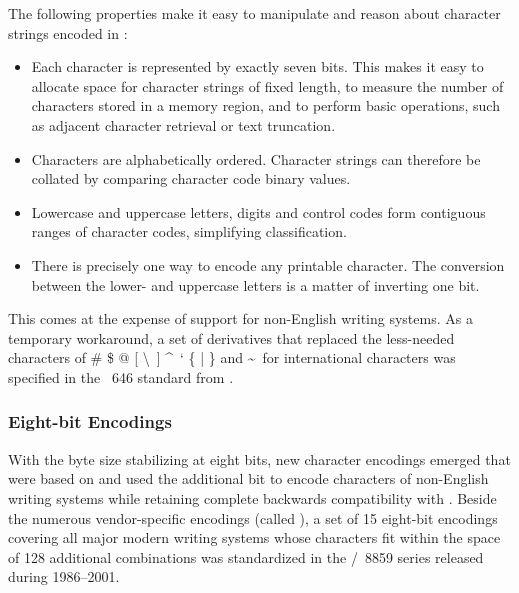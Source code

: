 The following properties make it easy to manipulate and reason about character
strings encoded in :
\begin{itemize}
  \item Each character is represented by exactly seven bits. This makes it easy
    to allocate space for character strings of fixed length, to measure the
    number of characters stored in a memory region, and to perform basic
    operations, such as adjacent character retrieval or text truncation.
  \item Characters are alphabetically ordered. Character strings can therefore
    be collated by comparing character code binary values.
  \item Lowercase and uppercase letters, digits and control codes form
    contiguous ranges of character codes, simplifying classification.
  \item There is precisely one way to encode any printable character. The
    conversion between the lower- and uppercase letters is a matter of
    inverting one bit.
\end{itemize}
This comes at the expense of support for non-English writing systems. As a
temporary workaround, a set of  derivatives that replaced the
less-needed characters of \# \$ @ [ \textbackslash\ ] \textasciicircum\ ` \{ |
\} and \textasciitilde\ for international characters was specified in the
~646 standard \cite{iso72} from \citeyear{iso72}.

\subsubsection{Eight-bit Encodings}
With the byte size stabilizing at eight bits, new character encodings emerged
that were based on  and used the additional bit to encode
characters of non-English writing systems while retaining complete backwards
compatibility with . Beside the numerous vendor-specific
encodings (called ), a set of 15 eight-bit encodings covering
all major modern writing systems whose characters fit within the space of 128
additional combinations was standardized in the
/~8859 series released during 1986--2001.


